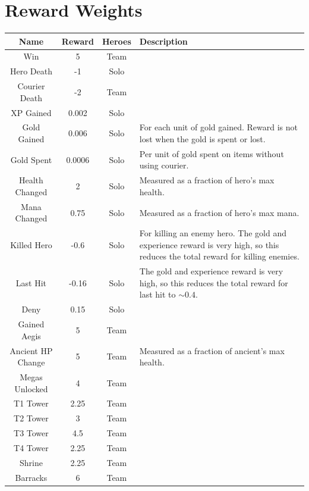 \documentclass[ocean-paper.tex]{subfiles}
\begin{document}
\section{Reward Weights}\label{appendix:rewards}
\begin{table}
\begin{threeparttable}
\begin{tabular}{c|c|c|p{8cm}}
    Name          & Reward & Heroes & Description \\\hline
    Win           & 5      & Team & \\
    Hero Death    & -1     & Solo & \\
    Courier Death & -2     & Team & \\
    XP Gained     & 0.002  & Solo & \\
    Gold Gained   & 0.006  & Solo & For each unit of gold gained. Reward is not lost when the gold is spent or lost. \\
    Gold Spent    & 0.0006 & Solo & Per unit of gold spent on items without using courier. \\
    Health Changed& 2      & Solo & Measured as a fraction of hero's max health.\tnote{$\ddagger$} \\
    Mana Changed  & 0.75   & Solo & Measured as a fraction of hero's max mana. \\
    Killed Hero   & -0.6   & Solo & For killing an enemy hero. The gold and experience reward is very high, so this reduces the total reward for killing enemies. \\
    Last Hit      & -0.16  & Solo & The gold and experience reward is very high, so this reduces the total reward for last hit to $\sim 0.4$. \\
    Deny          & 0.15   & Solo & \\
    Gained Aegis  & 5      & Team & \\
    Ancient HP Change & 5     & Team & Measured as a fraction of ancient's max health. \\
    Megas Unlocked   & 4      & Team & \\
    T1 Tower\tnote{*}      & 2.25   & Team & \\
    T2 Tower\tnote{*}      & 3   & Team & \\
    T3 Tower\tnote{*}    & 4.5 & Team & \\
    T4 Tower\tnote{*}    & 2.25 & Team & \\
    Shrine\tnote{*}      & 2.25 & Team & \\
    Barracks\tnote{*}    & 6 & Team & \\

\end{tabular}
\end{threeparttable}
\end{table}
\end{document}
